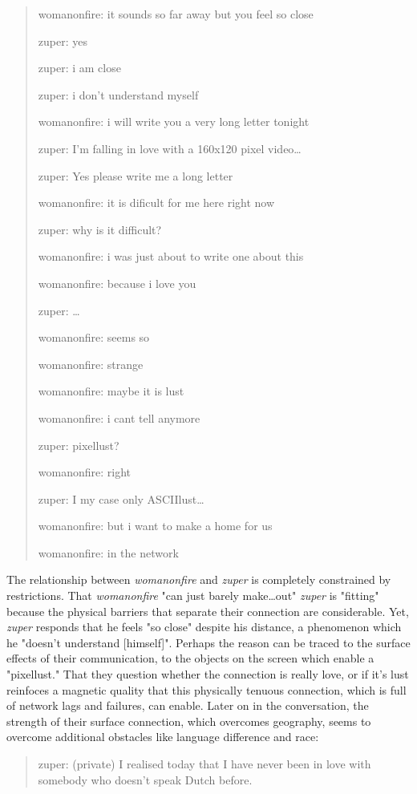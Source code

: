 \documentclass[11pt]{article}
\begin{document}
\begin{enumerate}
\begin{quote}
womanonfire: it sounds so far away but you feel so close

zuper: yes

zuper: i am close

zuper: i don't understand myself

womanonfire: i will write you a very long letter tonight

zuper: I'm falling in love with a 160x120 pixel video\ldots{}

zuper: Yes please write me a long letter

womanonfire: it is dificult for me here right now

zuper: why is it difficult?

womanonfire: i was just about to write one about this

womanonfire: because i love you

zuper: \ldots{}

womanonfire: seems so 

womanonfire: strange

womanonfire: maybe it is lust

womanonfire: i cant tell anymore

zuper: pixellust?

womanonfire: right

zuper: I my case only ASCIIlust\ldots{}

womanonfire: but i want to make a home for us

womanonfire: in the network
\end{quote}
The relationship between \emph{womanonfire} and \emph{zuper} is completely
constrained by restrictions. That \emph{womanonfire} "can just barely
make\ldots{}out" \emph{zuper} is "fitting" because the physical barriers that
separate their connection are considerable. Yet, \emph{zuper} responds that
he feels "so close" despite his distance, a phenomenon which he
"doesn't understand [himself]". Perhaps the reason can be traced to
the surface effects of their communication, to the objects on the
screen which enable a "pixellust." That they question whether the
connection is really love, or if it's lust reinfoces a magnetic
quality that this physically tenuous connection, which is full of
network lags and failures, can enable. Later on in the conversation,
the strength of their surface connection, which overcomes geography,
seems to overcome additional obstacles like language difference and
race:
\begin{quote}
zuper: (private) I realised today that I have never been in love with somebody who doesn't speak Dutch before.


\end{quote}
\end{enumerate}
\end{document}

